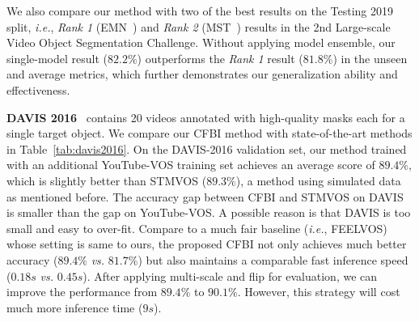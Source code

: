 \documentclass[runningheads]{llncs}
\def\ie{\emph{i.e.}}
\begin{document}
We also compare our method with two of the best results on the Testing 2019 split, \ie, \textit{Rank 1} (EMN~\cite{emn}) and \textit{Rank 2} (MST~\cite{mst}) results in the 2nd Large-scale Video Object Segmentation Challenge. Without applying model ensemble, our single-model result ($\mathbf{82.2\%}$) outperforms the \textit{Rank 1} result ($81.8\%$) in the unseen and average metrics, which further demonstrates our generalization ability and effectiveness.






\noindent \textbf{DAVIS 2016}~\cite{davis2016} contains 20 videos annotated with high-quality masks each for a single target object. We compare our CFBI method with state-of-the-art methods in Table~\ref{tab:davis2016}. On the DAVIS-2016 validation set, our method trained with an additional YouTube-VOS training set achieves an average score of $\mathbf{89.4\%}$, which is slightly better than STMVOS ($89.3\%$), a method using simulated data as mentioned before. The accuracy gap between CFBI and STMVOS on DAVIS is smaller than the gap on YouTube-VOS. A possible reason is that DAVIS is too small and easy to over-fit.
Compare to a much fair baseline (\ie, FEELVOS) whose setting is same to ours, the proposed CFBI not only achieves much better accuracy ($\mathbf{89.4\%}$ \emph{vs.}\hspace{-0.8mm} $81.7\%$) but also maintains a comparable fast inference speed ($0.18s$ \emph{vs.}\hspace{-0.8mm} $0.45s$). After applying multi-scale and flip for evaluation, we can improve the performance from $\mathbf{89.4\%}$ to $\mathbf{90.1\%}$. However, this strategy will cost much more inference time ($9s$).
\end{document}
